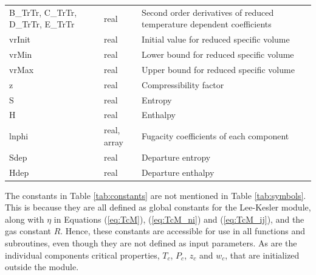 \documentclass[english]{../thermomemo/thermomemo}
\numberwithin{equation}{section}
\newcommand*{\reff}[1]{(\ref{#1})}
\begin{document}
\begin{table}[h!]
\begin{center}
\begin{tabular}{p{2.8cm} l p{8cm}}
B\_TrTr, C\_TrTr, D\_TrTr, E\_TrTr & real	& Second order derivatives of reduced temperature dependent coefficients \\
vrInit	& real		& Initial value for reduced specific volume \\
vrMin	& real		& Lower bound for reduced specific volume \\
vrMax	& real		& Upper bound for reduced specific volume \\
z		& real		& Compressibility factor \\
S		& real		& Entropy \\
H		& real		& Enthalpy \\
lnphi	& real, array & Fugacity coefficients of each component \\
Sdep 	& real		& Departure entropy \\
Hdep	& real		& Departure enthalpy \\
\hline
\end{tabular}
\end{center}
\end{table}

The constants in Table \ref{tab:constants} are not mentioned in Table \ref{tab:symbols}. This is because they are all defined as global constants for the Lee-Kesler module, along with $\eta$ in Equations \reff{eq:TcM}, \reff{eq:TcM_ni} and \reff{eq:TcM_ij}, and the gas constant $R$. Hence, these constants are accessible for use in all functions and subroutines, even though they are not defined as input parameters. As are the individual components critical properties, $T_c$, $P_c$, $z_c$ and $w_c$, that are initialized outside the module.
\end{document}
